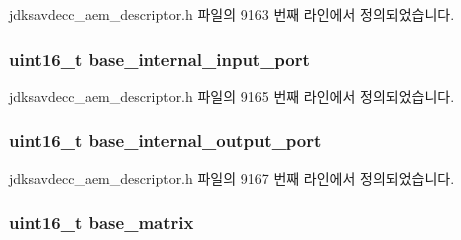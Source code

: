jdksavdecc\+\_\+aem\+\_\+descriptor.\+h 파일의 9163 번째 라인에서 정의되었습니다.

\subsubsection[{\texorpdfstring{base\+\_\+internal\+\_\+input\+\_\+port}{base_internal_input_port}}]{\setlength{\rightskip}{0pt plus 5cm}uint16\+\_\+t base\+\_\+internal\+\_\+input\+\_\+port}\hypertarget{structjdksavdecc__descriptor__video__unit_a11d926248b31db1ff60e6416c9c3d996}{}\label{structjdksavdecc__descriptor__video__unit_a11d926248b31db1ff60e6416c9c3d996}


jdksavdecc\+\_\+aem\+\_\+descriptor.\+h 파일의 9165 번째 라인에서 정의되었습니다.

\subsubsection[{\texorpdfstring{base\+\_\+internal\+\_\+output\+\_\+port}{base_internal_output_port}}]{\setlength{\rightskip}{0pt plus 5cm}uint16\+\_\+t base\+\_\+internal\+\_\+output\+\_\+port}\hypertarget{structjdksavdecc__descriptor__video__unit_a238f1b0f1c8556b5e9586d93541169a5}{}\label{structjdksavdecc__descriptor__video__unit_a238f1b0f1c8556b5e9586d93541169a5}


jdksavdecc\+\_\+aem\+\_\+descriptor.\+h 파일의 9167 번째 라인에서 정의되었습니다.

\subsubsection[{\texorpdfstring{base\+\_\+matrix}{base_matrix}}]{\setlength{\rightskip}{0pt plus 5cm}uint16\+\_\+t base\+\_\+matrix}\hypertarget{structjdksavdecc__descriptor__video__unit_a4faf17fd3b3d91f6b24fe8d66a042309}{}\label{structjdksavdecc__descriptor__video__unit_a4faf17fd3b3d91f6b24fe8d66a042309}



